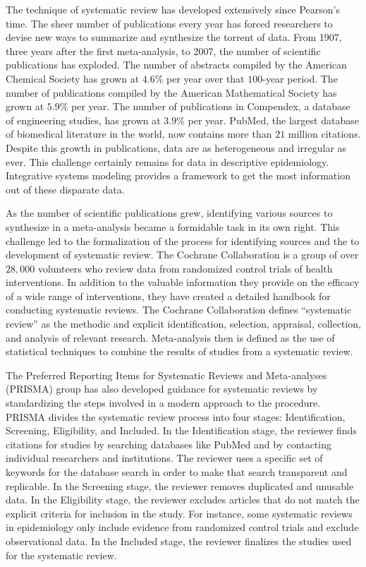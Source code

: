 The technique of systematic review has developed extensively since Pearson's time. The
sheer number of publications every year has forced researchers to
devise new ways to summarize and synthesize the torrent of data. From
1907, three years after the first meta-analysis, to 2007, the number of
scientific publications has exploded. The number of abstracts compiled by the
American Chemical Society has grown at $4.6$\% per year over that
$100$-year period. The number of publications compiled by the American Mathematical
Society has grown at $5.9$\% per year.  The number of publications in Compendex, a
database of engineering studies, has grown at $3.9$\% per year.
\cite{Larsen_Rate_2010} PubMed, the largest database of biomedical
literature in the world, now contains more than $21$ million citations.
\cite{us_national_library_of_medicine_national_institutes_of_health_pubmed_2012} Despite this growth in publications, data are
as heterogeneous and irregular as ever. This challenge certainly remains
for data in descriptive epidemiology. Integrative systems modeling
provides a framework to get the most information out of these disparate data.

As the number of scientific publications grew, identifying various
sources to synthesize in a meta-analysis became a formidable task in
its own right. This challenge led to the formalization of the process
for identifying sources and the to development of systematic review.
The Cochrane Collaboration is a
group of over $28,000$ volunteers who review data from randomized
control trials of health interventions.\cite{_cochrane_2012} In addition to the valuable information
they provide on the efficacy of a wide range of interventions, they have
created a detailed handbook for conducting systematic
reviews. The Cochrane Collaboration defines ``systematic review'' as the 
methodic and explicit identification, selection, appraisal, collection,
and analysis of relevant research.  Meta-analysis then is defined as the use of statistical
techniques to combine the results of studies from a systematic review.\cite{Green_Systematic_2005}

The Preferred Reporting Items for Systematic Reviews and Meta-analyses
(PRISMA) group has also developed guidance for systematic reviews by
standardizing the steps involved in a modern approach to
the procedure.\cite{moher_preferred_2009} PRISMA divides the systematic
review process into four stages: Identification, Screening,
Eligibility, and Included.  In the Identification stage, the reviewer
finds citations for studies by searching databases like PubMed and by
contacting individual researchers and institutions. The reviewer uses
a specific set of keywords for the database search in order to make
that search transparent and replicable. In the Screening stage, the
reviewer removes duplicated and unusable data. In the Eligibility stage,
the reviewer excludes articles that do not match the explicit criteria
for inclusion in the study. For instance, some systematic reviews in
epidemiology only include evidence from randomized control trials and
exclude observational data. In the Included stage, the reviewer
finalizes the studies used for the systematic review.

